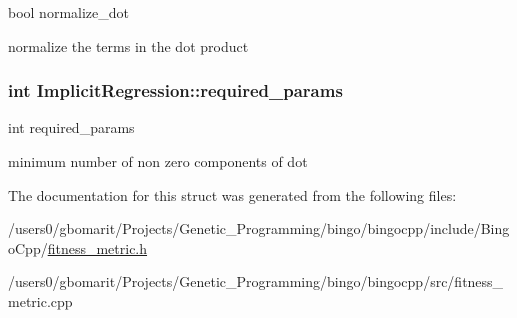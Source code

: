 bool normalize\+\_\+dot 

normalize the terms in the dot product 
\subsubsection[{\texorpdfstring{required\+\_\+params}{required_params}}]{\setlength{\rightskip}{0pt plus 5cm}int Implicit\+Regression\+::required\+\_\+params}\hypertarget{structImplicitRegression_a5f25461dae2b71ad79eaf7fb91c86696}{}\label{structImplicitRegression_a5f25461dae2b71ad79eaf7fb91c86696}


int required\+\_\+params 

minimum number of non zero components of dot 

The documentation for this struct was generated from the following files\+:\begin{DoxyCompactItemize}
\item 
/users0/gbomarit/\+Projects/\+Genetic\+\_\+\+Programming/bingo/bingocpp/include/\+Bingo\+Cpp/\hyperlink{fitness__metric_8h}{fitness\+\_\+metric.\+h}\item 
/users0/gbomarit/\+Projects/\+Genetic\+\_\+\+Programming/bingo/bingocpp/src/fitness\+\_\+metric.\+cpp\end{DoxyCompactItemize}

